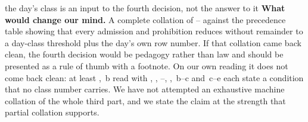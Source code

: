 \begin{synthesis}{the day's class is an input to the fourth decision, not the
answer to it}
\textbf{What would change our mind.} A complete collation of --
against the precedence table showing that every admission and prohibition
reduces without remainder to a day-class threshold plus the day's own row
number. If that collation came back clean, the fourth decision would be
pedagogy rather than law and should be presented as a rule of thumb with a
footnote. On our own reading it does not come back clean: at least
, \,b read with , , --,
, \,b--c and \,c--e each state a condition that no
class number carries. We have not attempted an exhaustive machine collation of
the whole third part, and we state the claim at the strength that partial
collation supports.
\end{synthesis}
